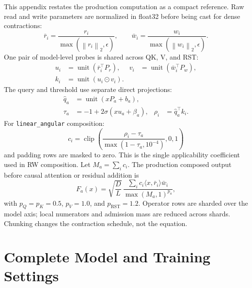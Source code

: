 \documentclass{article}
\newcommand{\norm}[1]{\left\lVert #1 \right\rVert}
\newcommand{\od}{\mathbin{\odot}}
\begin{document}
This appendix restates the production computation as a compact reference. Raw
read and write parameters are normalized in float32 before being cast for
dense contractions:
\[
\bar r_i=\frac{r_i}{\max(\norm{r_i}_2,\epsilon)},\qquad
\bar w_i=\frac{w_i}{\max(\norm{w_i}_2,\epsilon)}.
\]
One pair of model-level probes is shared across QK, V, and RST:
\[
\begin{aligned}
u_i&=\operatorname{unit}(\bar r_i^\top P_r),&
v_i&=\operatorname{unit}(\bar w_i^\top P_w),\\
k_i&=\operatorname{unit}(u_i\od v_i).&&
\end{aligned}
\]
The query and threshold use separate direct projections:
\[
\begin{aligned}
\hat q_a&=\operatorname{unit}(xP_a+b_a),\\
\tau_a&=-1+2\sigma(xu_a+\beta_a),&
\rho_i&=\hat q_a^\top k_i.
\end{aligned}
\]
For \texttt{linear\_angular} composition:
\[
c_i=
\operatorname{clip}\!\left(
\frac{\rho_i-\tau_a}{\max(1-\tau_a,10^{-4})},0,1\right)
\]
and padding rows are masked to zero. This is the single applicability
coefficient used in RW composition. Let \(M_a=\sum_i c_i\). The production
composed output before causal attention or residual addition is
\[
F_a(x)=
\sqrt{\frac{D}{L}}\,
\frac{\sum_i c_i\langle x,\bar r_i\rangle\bar w_i}
{\max(M_a,1)^{p_a}},
\]
with \(p_Q=p_K=0.5\), \(p_V=1.0\), and \(p_{\mathrm{RST}}=1.2\).
Operator rows are sharded over the model axis; local numerators and admission
mass are reduced across shards. Chunking changes the contraction schedule, not
the equation.

\section{Complete Model and Training Settings}
\label{app:settings}
\end{document}

